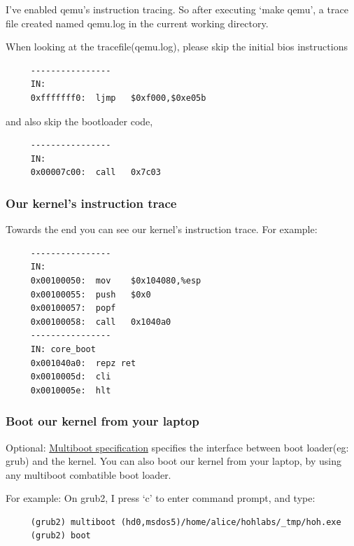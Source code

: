 \documentclass[]{book}
\begin{document}
I've enabled qemu's instruction tracing. So after executing `make qemu',
a trace file created named qemu.log in the current working directory.

When looking at the tracefile(qemu.log), please skip the initial bios
instructions

\begin{verbatim}
     ----------------
     IN:
     0xfffffff0:  ljmp   $0xf000,$0xe05b
\end{verbatim}

and also skip the bootloader code,

\begin{verbatim}
     ----------------
     IN:
     0x00007c00:  call   0x7c03
\end{verbatim}

\subsubsection*{Our kernel's instruction
trace}\label{our-kernels-instruction-trace}

Towards the end you can see our kernel's instruction trace. For example:

\begin{verbatim}
     ----------------
     IN:
     0x00100050:  mov    $0x104080,%esp
     0x00100055:  push   $0x0
     0x00100057:  popf
     0x00100058:  call   0x1040a0
     ----------------
     IN: core_boot
     0x001040a0:  repz ret
     0x0010005d:  cli
     0x0010005e:  hlt
\end{verbatim}

\subsubsection*{Boot our kernel from your
laptop}\label{boot-our-kernel-from-your-laptop}

Optional:
\href{http://www.gnu.org/software/grub/manual/multiboot/multiboot.pdf}{Multiboot
specification} specifies the interface between boot loader(eg: grub) and
the kernel. You can also boot our kernel from your laptop, by using any
multiboot combatible boot loader.

For example: On grub2, I press `c' to enter command prompt, and type:

\begin{verbatim}
     (grub2) multiboot (hd0,msdos5)/home/alice/hohlabs/_tmp/hoh.exe
     (grub2) boot
\end{verbatim}
\end{document}
